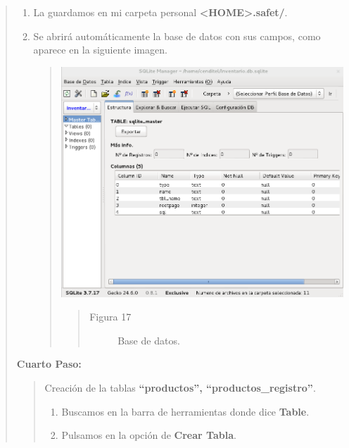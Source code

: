 \documentclass[letterpaper,11pt,spanish]{sphinxmanual}
\begin{document}
\begin{quote}
\begin{enumerate}
\begin{quote}
\begin{quote}
\begin{description}
\end{description}\end{quote}
\end{quote}

\item {} 
La guardamos en mi carpeta personal \textbf{\textless{}HOME\textgreater{}.safet/}.

\item {} 
Se abrirá automáticamente la base de datos con sus campos, como aparece en la siguiente imagen.
\begin{quote}

\includegraphics{buscar3.png}
\begin{quote}\begin{description}
\item[{Figura 17}] \leavevmode
Base de datos.

\end{description}\end{quote}
\end{quote}

\end{enumerate}

\textbf{Cuarto Paso:}
\begin{quote}

Creación de la tablas \textbf{``productos'', ``productos\_registro''}.
\begin{enumerate}
\item {} 
Buscamos en la barra de herramientas donde dice \textbf{Table}.

\item {} 
Pulsamos en la opción de \textbf{Crear Tabla}.
\begin{quote}


\end{quote}
\end{enumerate}
\end{quote}
\end{quote}
\end{document}
